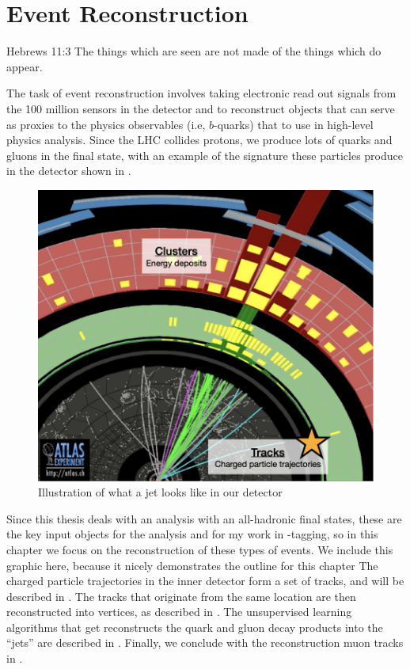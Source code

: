 \chapter{Event Reconstruction}
\label{ch:evtReco}

\begin{chapquote}{Hebrews 11:3}
{The things which are seen are not made of the things which do appear.}
\end{chapquote}

The task of event reconstruction involves taking electronic read out signals from the 100 million sensors in the detector and to reconstruct objects that can serve as proxies to the physics observables (i.e, $b$-quarks) %
that to use in high-level physics analysis.
Since the LHC collides protons, %
we produce lots of quarks and gluons in the final state, with an example of the signature these particles produce in the detector shown in \Fig{\ref{fig:tracks-clusters-annotated}}.

\begin{figure}[hbt]
\centering
\includegraphics[width=.6\textwidth]{figures/cp-graphics/tracks-clusters-annotated}
\caption{Illustration of what a jet looks like in our detector}
\label{fig:tracks-clusters-annotated}
\end{figure}

Since this thesis deals with an analysis with an all-hadronic final states, these are the key input objects for the analysis and for my work in \Pqb-tagging, so in this chapter we focus on the reconstruction of these types of events.
We include this graphic here, because it nicely demonstrates the outline for this chapter
The charged particle trajectories in the inner detector form a set of tracks, and will be described in \Sect{\ref{sec:tracks}}.
The tracks that originate from the same location are then reconstructed into vertices, as described in \Sect{\ref{sec:vertices}}.
The unsupervised learning algorithms that get reconstructs the quark and gluon decay products into the ``jets'' are described in \Sect{\ref{sec:jets}}.
Finally, we conclude with the reconstruction muon tracks in \Sect{\ref{sec:muons}}.


